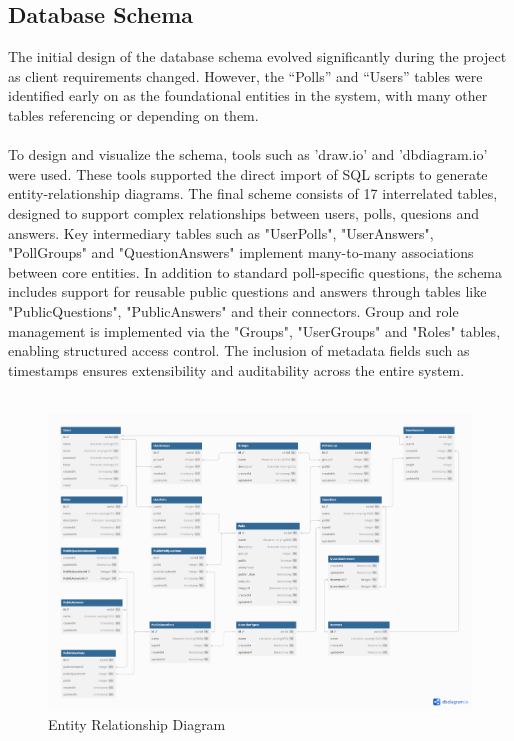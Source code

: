 \documentclass[a4paper,12pt]{report}
\begin{document}
\subsection{Database Schema}
The initial design of the database schema evolved significantly during the project as client requirements changed. However, the “Polls” and “Users” tables were identified early on as the foundational entities in the system, with many other tables referencing or depending on them.\\\\
To design and visualize the schema, tools such as 'draw.io' and 'dbdiagram.io' were used. These tools supported the direct import of SQL scripts to generate entity-relationship diagrams. The final scheme consists of 17 interrelated tables, designed to support complex relationships between users, polls, quesions and answers. Key intermediary tables such as "UserPolls", "UserAnswers", "PollGroups" and "QuestionAnswers" implement many-to-many associations between core entities. In addition to standard poll-specific questions, the schema includes support for reusable public questions and answers through tables like "PublicQuestions", "PublicAnswers" and their connectors. Group and role management is implemented via the "Groups", "UserGroups" and "Roles" tables, enabling structured access control. The inclusion of metadata fields such as timestamps ensures extensibility and auditability across the entire system.\\ \\
\begin{figure}
	\centering
	\includegraphics[width=\textheight]{pics/ERD_NEW.png}
	\caption{Entity Relationship Diagram}
	\label{fig:new_ERD}
\end{figure}
\end{document}
